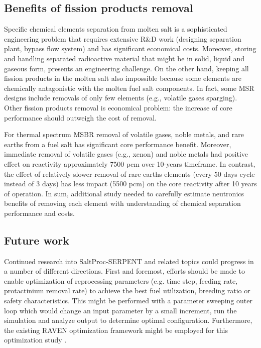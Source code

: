 \subsection{Benefits of fission products removal}
Specific chemical elements separation from molten salt is a sophisticated 
engineering problem that requires    extensive R\&D work (designing separation 
plant, bypass flow system) and has significant economical costs. Moreover, 
storing and handling separated radioactive material that might be in solid, 
liquid and gaseous form, presents an engineering challenge. On the other hand, 
keeping all fission products in the molten salt  also impossible because some 
elements are chemically antagonistic with the molten fuel salt components. In 
fact, some \gls{MSR} designs include removals of only few elements (e.g., 
volatile gases sparging). Other fission products removal is economical problem: 
the increase of core performance should outweigh the cost of removal.

For thermal spectrum \gls{MSBR} removal of volatile gases, noble metals, and 
rare earths from a fuel salt has significant core performance benefit. 
Moreover, immediate removal of volatile gases (e.g., xenon) and noble metals 
had positive effect on reactivity approximately 7500 pcm over 10-years 
timeframe. In contrast, the effect of relatively slower removal of rare earths 
elements (every 50 days cycle instead of 3 days) has less impact (5500 pcm) on 
the core reactivity after 10 years of operation. In sum, additional study 
needed to carefully estimate neutronics benefits of removing each element with 
understanding of chemical separation performance and costs.

\subsection{Future work}
Continued research into SaltProc-SERPENT and related topics could progress in a 
number of different directions. First and foremost, efforts should be made to 
enable optimization of reprocessing parameters (e.g. time step, feeding rate, 
protactinium removal rate) to achieve the best fuel utilization, breeding ratio 
or safety characteristics. This might be performed with a parameter sweeping 
outer loop which would change an input parameter by a small increment, run the 
simulation and analyze output to determine optimal configuration. Furthermore, 
the existing RAVEN optimization framework might be employed for this 
optimization study \cite{alfonsi_raven_2013}.

